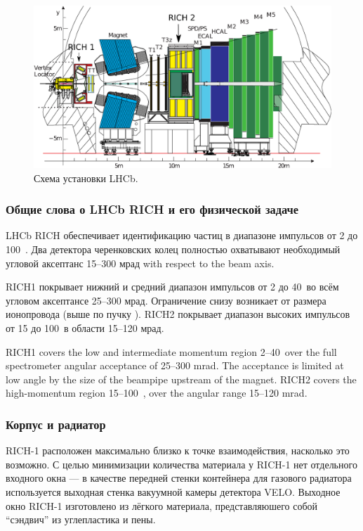 \begin{figure}[H]
\centering
\includegraphics[width=1.0\textwidth]{pictures/LHCb.png}
\caption{Схема установки LHCb.}
\label{fig:LHCb}
\end{figure}

\subsubsection{Общие слова о LHCb RICH и его физической задаче}

LHCb RICH обеспечивает идентификацию частиц в диапазоне импульсов от 2 до 100~\GeVoverC. Два детектора черенковских колец полностью охватывают необходимый угловой аксептанс 15--300 мрад with respect to the beam axis.

RICH1 покрывает нижний и средний диапазон импульсов от 2 до 40~\GeVoverC во всём угловом аксептансе 25--300 мрад. Ограничение снизу возникает от размера ионопровода (выше по пучку \todo). RICH2 покрывает диапазон высоких импульсов от 15 до 100~\GeVoverC в области 15--120 мрад.

RICH1 covers the low and intermediate momentum region 2–40~\GeVoverC over the full spectrometer angular acceptance of 25–300 mrad. The acceptance is limited at low angle by the size of the beampipe upstream of the magnet. RICH2 covers the high-momentum region 15–100~\GeVoverC, over the angular range 15–120 mrad.

\subsubsection{Корпус и радиатор}

\mbox{RICH-1} расположен максимально близко к точке взаимодействия, насколько это возможно. С целью минимизации количества материала у \mbox{RICH-1} нет отдельного входного окна --- в качестве передней стенки контейнера для газового радиатора используется выходная стенка вакуумной камеры детектора VELO. Выходное окно \mbox{RICH-1} изготовлено из лёгкого материала, представляюшего собой ``сэндвич'' из углепластика и пены.


